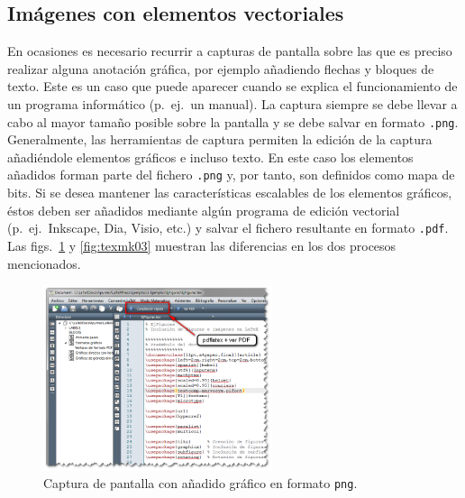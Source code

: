 \documentclass[11pt,a4paper]{article}
\begin{document}
\subsection{Imágenes con elementos vectoriales}
En ocasiones es necesario recurrir a capturas de pantalla sobre las que es preciso realizar alguna anotación gráfica, por ejemplo añadiendo flechas y bloques de texto. Este es un caso que puede aparecer cuando se explica el funcionamiento de un programa informático (p.~ej.\ un manual). La captura siempre se debe llevar a cabo al mayor tamaño posible sobre la pantalla y se debe salvar en formato \texttt{.png}. Generalmente, las herramientas de captura permiten la edición de la captura añadiéndole elementos gráficos e incluso texto. En este caso los elementos añadidos 
forman parte del fichero \texttt{.png} y, por tanto, son definidos como mapa de bits. Si se desea mantener las características escalables de los elementos gráficos, éstos deben ser añadidos mediante algún programa de edición vectorial (p.~ej.\ 
\textsf{Inkscape}, \textsf{Dia}, \textsf{Visio}, etc.) y salvar el fichero resultante en formato \texttt{.pdf}. Las figs.~\ref{fig:texmk02} y \ref{fig:texmk03} muestran las diferencias en los dos procesos mencionados.

\begin{figure}[H]
	\centering
	\includegraphics[width=0.6\textwidth]{texmk02} 
	\caption[Captura con gráfico en \texttt{png}]{Captura de pantalla con añadido gráfico en formato \texttt{png}.}
	\label{fig:texmk02}
\end{figure}
\end{document}
